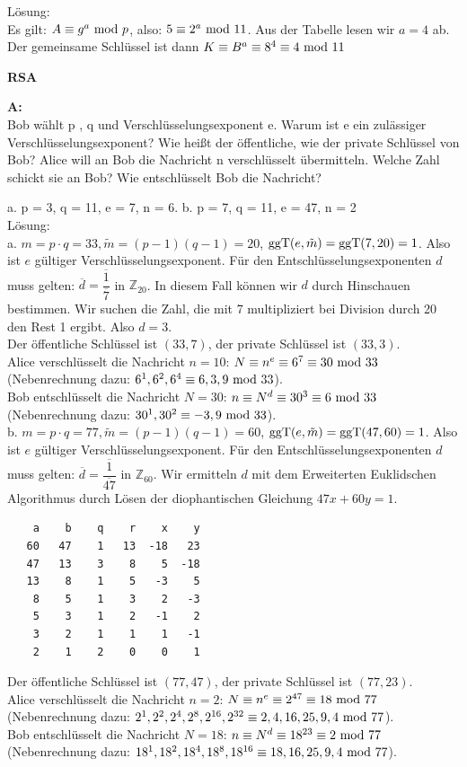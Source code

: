 \documentclass[landscape,twocolumn,a4paper]{article}
\begin{document}
Lösung: \\
Es gilt: $A \equiv g^a \text{ mod } p$, also: $ 5 \equiv 2^a \text{ mod } 11$. Aus der Tabelle lesen wir $a = 4$ ab. Der gemeinsame Schlüssel ist dann $K \equiv B^a \equiv 8^4 \equiv 4 \text{ mod } 11$
 \bigskip {}
 
\newpage

\textbf{RSA} \bigskip

\textbf{A:}   \\
Bob wählt p , q  und Verschlüsselungsexponent e. Warum ist e ein
zulässiger Verschlüsselungsexponent? Wie heißt der öffentliche, wie der private Schlüssel von Bob?
Alice will an Bob die Nachricht n verschlüsselt übermitteln.  
Welche Zahl schickt sie an Bob? Wie entschlüsselt Bob die Nachricht?

a.  p = 3, q = 11,  e = 7, n = 6. \quad
b.  p = 7, q = 11, e = 47, n = 2 \\

Lösung: \\
a. $m = p \cdot q = 33, \tilde{m} = (p-1)(q-1) = 20$, $\operatorname{ggT}(e,\tilde{m}) = \operatorname{ggT}(7,20) = 1$. Also ist
$e$ gültiger Verschlüsselungsexponent. Für den Entschlüsselungsexponenten $d$ muss gelten:
$\overline{d} = \dfrac{\overline{1}}{\overline{7}}$ in $\mathbb{Z}_{20}$. In diesem Fall können wir 
$d$ durch Hinschauen bestimmen. Wir suchen die Zahl, die mit 7 multipliziert bei Division durch 20 den Rest 1 ergibt. Also $d = 3$. \\
Der öffentliche Schlüssel ist $(33,7)$, der private Schlüssel ist $(33,3)$. \\
Alice verschlüsselt die Nachricht $n=10$: $N \equiv n^e \equiv 6^7 \equiv 30 \text{ mod } 33$
(Nebenrechnung dazu: $6^1, 6^2, 6^4 \equiv 6, 3, 9 \text{ mod } 33$).\\
Bob entschlüsselt die Nachricht $N=30$: $n \equiv N^d \equiv 30^3  \equiv 6 \text{ mod } 33$
(Nebenrechnung dazu: $30^1, 30^2 \equiv -3, 9 \text{ mod } 33$). \\

b. $m = p \cdot q = 77, \tilde{m} = (p-1)(q-1) = 60$, $\operatorname{ggT}(e,\tilde{m}) = \operatorname{ggT}(47,60) = 1$. Also ist
$e$ gültiger Verschlüsselungsexponent. Für den Entschlüsselungsexponenten $d$ muss gelten:
$\overline{d} = \dfrac{\overline{1}}{\overline{47}}$ in $\mathbb{Z}_{60}$. Wir ermitteln $d$ mit dem Erweiterten Euklidschen Algorithmus durch Lösen der diophantischen Gleichung $47x + 60y = 1$. \\
\begin{lstlisting}
    a    b    q    r    x    y
   60   47    1   13  -18   23
   47   13    3    8    5  -18
   13    8    1    5   -3    5
    8    5    1    3    2   -3
    5    3    1    2   -1    2
    3    2    1    1    1   -1
    2    1    2    0    0    1
\end{lstlisting}
Der öffentliche Schlüssel ist $(77,47)$, der private Schlüssel ist $(77,23)$. \\
Alice verschlüsselt die Nachricht $n=2$: $N \equiv n^e \equiv 2^{47} \equiv 18 \text{ mod } 77$
(Nebenrechnung dazu: $2^1, 2^2, 2^4,2^8,2^{16},2^{32}\equiv 2, 4, 16,25,9,4 \text{ mod } 77$).\\
Bob entschlüsselt die Nachricht $N=18$: $n \equiv N^d \equiv 18^{23}  \equiv 2 \text{ mod } 77$
(Nebenrechnung dazu: $18^1, 18^2, 18^4, 18^8, 18^{16} \equiv 18,16,25,9,4 \text{ mod } 77$).
\end{document}
